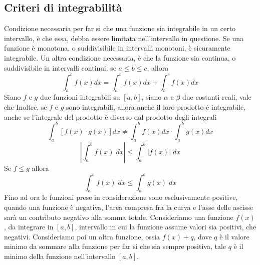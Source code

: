 \documentclass[10pt, letterpaper]{report}
\begin{document}
\subsection{Criteri di integrabilità}
Condizione necessaria per far si che una funzione sia integrabile in un certo intervallo, è che essa, debba 
essere limitata nell'intervallo in questione. Se una funzione è monotona, o suddivisibile in intervalli 
monotoni, è sicuramente integrabile.\acc 
Un altra condizione necessaria, è che la funzione sia continua, o suddivisibile in intervalli 
continui.\acc \prop{} se $a\le b\le c$, allora $$
\int_a^c f(x)dx=\int_a^b f(x)dx+\int_b^c f(x)dx
$$
 Siano $f$ e $g$ due funzioni integrabili su $[a,b]$, siano $\alpha$ e 
$\beta$ due costanti reali, vale che 
Inoltre, se $f$ e $g$ sono integrabili, allora anche il loro prodotto è integrabile, anche se l'integrale 
del prodotto è diverso dal prodotto degli integrali 
$$  \int_a^b [f(x)\cdot g(x)]dx 
\ne \int_a^bf(x)dx \cdot \int_a^bg(x)dx$$
$$ | \int_a^bf(x)\;dx|\le \int_a^b|f(x)|\;dx$$\acc 
{} Se $f\le g$ allora
$$ \int_a^bf(x)\;dx \le \displaystyle \int_a^bg(x)\;dx$$
Fino ad ora le funzioni prese in considerazione sono esclusivamente positive, quando una funzione 
è negativa, l'area compresa fra la curva e l'asse delle ascisse sarà un contributo negativo alla 
somma totale.\acc 
Consideriamo una funzione $f(x)$, da integrare in $[a,b]$, intervallo in cui la funzione assume 
valori sia positivi, che negativi. Consideriamo poi un altra funzione, ossia $f(x)+q$, dove 
$q$ è il valore minimo da sommare alla funzione per far si che sia sempre positiva, tale $q$ è 
il minimo della funzione nell'intervallo $[a,b]$. 
\begin{center}
    \end{center}
\end{document}
